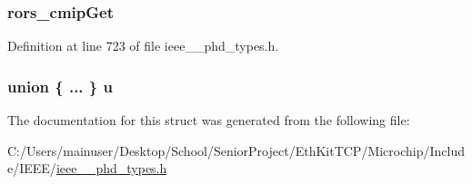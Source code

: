 \subsubsection[{rors\+\_\+cmip\+Get}]{ rors\+\_\+cmip\+Get}\label{struct___d_a_t_a__apdu_a97e81a762d3f8e8dfcee6b20c3061e19}


Definition at line 723 of file ieee\+\_\+\_\+phd\+\_\+types.\+h.

\hypertarget{struct___d_a_t_a__apdu_ac0b0785c6a2a08fbae3111d42ffa45e8}{}
\subsubsection[{u}]{\setlength{\rightskip}{0pt plus 5cm}union \{ ... \}   u}\label{struct___d_a_t_a__apdu_ac0b0785c6a2a08fbae3111d42ffa45e8}


The documentation for this struct was generated from the following file\+:\begin{DoxyCompactItemize}
\item 
C\+:/\+Users/mainuser/\+Desktop/\+School/\+Senior\+Project/\+Eth\+Kit\+T\+C\+P/\+Microchip/\+Include/\+I\+E\+E\+E/\hyperlink{ieee__11073__phd__types_8h}{ieee\+\_\+\_\+phd\+\_\+types.\+h}\end{DoxyCompactItemize}
